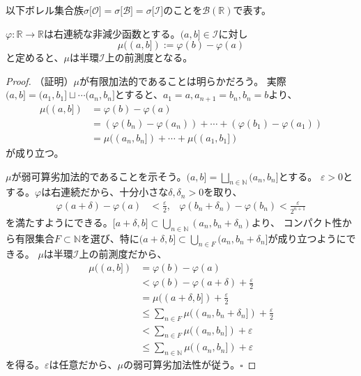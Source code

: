 \documentclass[../root.tex]{subfiles}
\begin{document}
以下ボレル集合族$ \sigma\lbrack \mathcal{O} \rbrack=\sigma\lbrack \mathcal{B} \rbrack=\sigma\lbrack \mathscr{I} \rbrack $のことを$ \mathscr{B}( \mathbb{R} ) $で表す。

\begin{Prop}{}{}
$ \varphi\colon\mathbb{R}\rightarrow\mathbb{R} $は右連続な非減少函数とする。$ ( a, b \rbrack\in\mathscr{I} $に対し
\[ \mu( ( a, b \rbrack ):=\varphi( b )-\varphi( a ) \]
と定めると、$ \mu $は半環$ \mathscr{I} $上の前測度となる。
\end{Prop}

\begin{proof}
（証明）$ \mu $が有限加法的であることは明らかだろう。
実際$ ( a, b \rbrack=( a_{1}, b_{1} \rbrack\sqcup\dotsm( a_{n}, b_{n} \rbrack $とすると、$ a_{1}=a, a_{n+1}=b_{n}, b_{n}=b $より、
\begin{align*}
\mu( ( a, b \rbrack ) &= \varphi( b )-\varphi( a ) \\
&= ( \varphi( b_{n} )-\varphi( a_{n} ) )+\dotsm+( \varphi( b_{1} )-\varphi( a_{1} ) ) \\
&= \mu( ( a_{n}, b_{n} \rbrack )+\dotsm+\mu( ( a_{1}, b_{1} \rbrack )
\end{align*}
が成り立つ。

$ \mu $が弱可算劣加法的であることを示そう。$ ( a, b \rbrack=\bigsqcup_{n\in\mathbb{N}}( a_{n}, b_{n} \rbrack $とする。
$ \varepsilon\gt 0 $とする。$ \varphi $は右連続だから、十分小さな$ \delta, \delta_{n} \gt 0 $を取り、
\begin{align*}
\varphi( a+\delta )-\varphi( a )&\lt\frac{\varepsilon}{2}, & \varphi( b_{n}+\delta_{n} )-\varphi( b_{n} )\lt\frac{\varepsilon}{2^{n+1}}
\end{align*}
を満たすようにできる。$ \lbrack a+\delta, b \rbrack\subset\bigcup_{n\in\mathbb{N}}( a_{n}, b_{n}+\delta_{n} ) $より、
コンパクト性から有限集合$ F\subset\mathbb{N} $を選び、特に$ ( a+\delta, b \rbrack\subset\bigcup_{n\in F}( a_{n}, b_{n}+\delta_{n} \rbrack $が成り立つようにできる。
$ \mu $は半環$ \mathscr{I} $上の前測度だから、
\begin{align*}
\mu( ( a, b \rbrack ) &= \varphi( b )-\varphi( a ) \\
&\lt \varphi( b )-\varphi( a+\delta )+\frac{\varepsilon}{2} \\
&= \mu( ( a+\delta, b \rbrack )+\frac{\varepsilon}{2} \\
&\le\sum_{n\in F}\mu( ( a_{n}, b_{n}+\delta_{n} \rbrack )+\frac{\varepsilon}{2} \\
&\lt \sum_{n\in F}\mu( ( a_{n}, b_{n} \rbrack )+\varepsilon \\
&\le \sum_{n\in\mathbb{N}}\mu( ( a_{n}, b_{n} \rbrack )+\varepsilon
\end{align*}
を得る。$ \varepsilon $は任意だから、$ \mu $の弱可算劣加法性が従う。$ \square $
\end{proof}
\end{document}
